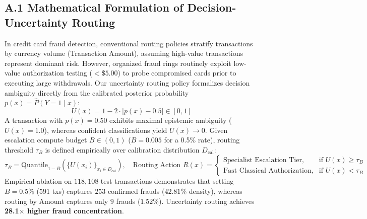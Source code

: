 \documentclass[10pt,a4paper]{article}
\begin{document}
\subsection*{A.1 Mathematical Formulation of Decision-Uncertainty Routing}
In credit card fraud detection, conventional routing policies stratify transactions by currency volume (Transaction Amount), assuming high-value transactions represent dominant risk. However, organized fraud rings routinely exploit low-value authorization testing ($<\$5.00$) to probe compromised cards prior to executing large withdrawals. 
Our uncertainty routing policy formalizes decision ambiguity directly from the calibrated posterior probability $p(x) = \hat{P}(Y=1 \mid x)$:
\begin{equation}
U(x) = 1 - 2 \cdot |p(x) - 0.5| \in [0, 1]
\end{equation}
A transaction with $p(x) = 0.50$ exhibits maximal epistemic ambiguity ($U(x) = 1.0$), whereas confident classifications yield $U(x) \rightarrow 0$. Given escalation compute budget $B \in (0, 1)$ ($B = 0.005$ for a 0.5\% rate), routing threshold $\tau_B$ is defined empirically over calibration distribution $D_{\text{cal}}$:
\begin{equation}
\tau_B = \text{Quantile}_{1 - B} \left( \{ U(x_i) \}_{x_i \in D_{\text{cal}}} \right), \quad \text{Routing Action } R(x) = 
\begin{cases}
\text{Specialist Escalation Tier}, & \text{if } U(x) \ge \tau_B \\
\text{Fast Classical Authorization}, & \text{if } U(x) < \tau_B
\end{cases}
\end{equation}
Empirical ablation on $118,108$ test transactions demonstrates that setting $B = 0.5\%$ ($591$ txs) captures $253$ confirmed frauds ($42.81\%$ density), whereas routing by Amount captures only $9$ frauds ($1.52\%$). Uncertainty routing achieves \textbf{28.1$\times$ higher fraud concentration}.
\end{document}
